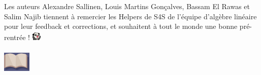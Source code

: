 \documentclass{article}
\begin{document}
Les auteurs Alexandre Sallinen, Louis Martins Gonçalves, Bassam El Rawas et Salim Najib tiennent à remercier les Helpers de S4S de l'équipe d'algèbre linéaire pour leur feedback et corrections, et souhaitent à tout le monde une bonne pré-rentrée ! \includegraphics[height=1.2em]{pandahug.png}

\begin{center}
    \includegraphics[width=50px,height = 50px]{logo.jpg}
\end{center}
\end{document}
